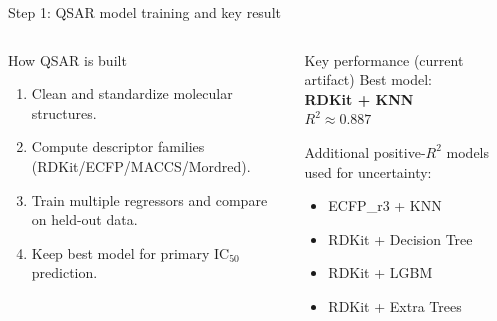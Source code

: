 \documentclass[aspectratio=169,10pt]{beamer}
\begin{document}
\begin{frame}{Step 1: QSAR model training and key result}
  \begin{columns}[T]
      \begin{block}{How QSAR is built}
        \begin{enumerate}
          \item Clean and standardize molecular structures.
          \item Compute descriptor families (RDKit/ECFP/MACCS/Mordred).
          \item Train multiple regressors and compare on held-out data.
          \item Keep best model for primary IC\(_{50}\) prediction.
        \end{enumerate}
      \end{block}
      \begin{block}{Key performance (current artifact)}
        \small
        Best model:\\
        \textbf{RDKit + KNN}\\
        \(R^2 \approx 0.887\)

        \vspace{4pt}
        Additional positive-\(R^2\) models used for uncertainty:
        \begin{itemize}
          \item ECFP\_r3 + KNN
          \item RDKit + Decision Tree
          \item RDKit + LGBM
          \item RDKit + Extra Trees
        \end{itemize}
      \end{block}
  \end{columns}
\end{frame}
\end{document}
